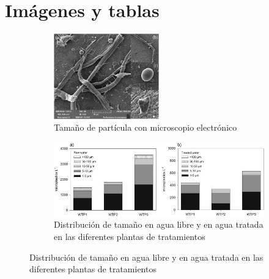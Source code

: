 \documentclass[a4paper,11pt]{article}
\begin{document}
\section{Imágenes y tablas}
	\begin{figure}[h!]
		\centering
		\begin{subfigure}[h]{0.45\textwidth}
			\includegraphics[width=0.5\textwidth]{electronico.jpg}
			\caption{Tamaño de partícula con microscopio electrónico}
		\end{subfigure}
		\begin{subfigure}[h]{0.45\textwidth}
		\includegraphics[width=1.2\textwidth]{size.jpg}
		\caption{Distribución de tamaño en agua libre y en agua tratada en las diferentes plantas de tratamientos}
		\end{subfigure}
		
	\end{figure}
	
\end{document}
